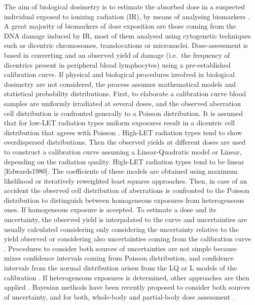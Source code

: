 \documentclass[]{scrartcl}
\begin{document}
The aim of biological dosimetry is to estimate the absorbed dose in a suspected individual exposed to ionizing radiation (IR), by means of analysing biomarkers \citep{IAEA2011}. A great majority of biomarkers of dose exposition are those coming from the DNA damage induced by IR, most of them analysed using cytogenetic techniques such as dicentric chromosomes, translocations or micronuclei. Dose-assessment is based in converting and an observed yield of damage (i.e.~the frequency of dicentrics present in peripheral blood lymphocytes) using a pre-established calibration curve. If physical and biological procedures involved in biological dosimetry are not considered, the process assumes mathematical models and statistical probability distributions. First, to elaborate a calibration curve blood samples are uniformly irradiated at several doses, and the observed aberration cell distribution is confronted generally to a Poisson distribution. It is assumed that for low-LET radiation types uniform exposures result in a dicentric cell distribution that agrees with Poisson \citep{Edwards1979}. High-LET radiation types tend to show overdispersed distributions. Then the observed yields at different doses are used to construct a calibration curve assuming a Linear-Quadratic model or Linear, depending on the radiation quality. High-LET radiation types tend to be linear {[}Edwards1980{]}. The coefficients of these models are obtained using maximum likelihood or iteratively reweighted least squares approaches. Then, in case of an accident the observed cell distribution of aberrations is confronted to the Poisson distribution to distinguish between homogeneous exposures from heterogeneous ones. If homogeneous exposure is accepted. To estimate a dose and its uncertainty, the observed yield is interpolated to the curve and uncertainties are usually calculated considering only considering the uncertainty relative to the yield observed or considering also uncertainties coming from the calibration curve \citep[Edwards1978;][]{Merkle1983, Savage2000}. Procedures to consider both sources of uncertainties are not simple because mixes confidence intervals coming from Poisson distribution, and confidence intervals from the normal distribution arisen from the LQ or L models of the calibration \citep{Merkle1983, Savage2000}. If heterogeneous exposures is determined, other approaches are then applied \citep[Dolphin1969;][]{Sasaki1968, Pujol2016}. Bayesian methods have been recently proposed to consider both sources of uncertainty, and for both, whole-body and partial-body dose assessment \citep{Ainsbury2014, Morina2015, Higueras2015}.
\end{document}
